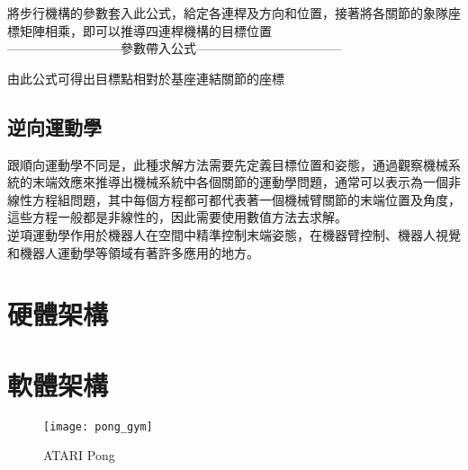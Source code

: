 將步行機構的參數套入此公式，給定各連桿及方向和位置，接著將各關節的象隊座標矩陣相乘，即可以推導四連桿機構的目標位置\\

---------------------------參數帶入公式-----------------------------------


由此公式可得出目標點相對於基座連結關節的座標\\

\subsection{逆向運動學}
跟順向運動學不同是，此種求解方法需要先定義目標位置和姿態，通過觀察機械系統的末端效應來推導出機械系統中各個關節的運動學問題，通常可以表示為一個非線性方程組問題，其中每個方程都可都代表著一個機械臂關節的末端位置及角度，這些方程一般都是非線性的，因此需要使用數值方法去求解。\\
逆項運動學作用於機器人在空間中精準控制末端姿態，在機器臂控制、機器人視覺和機器人運動學等領域有著許多應用的地方。\\

\section{硬體架構}
 
 \section{軟體架構}
\begin{figure}[hbt!]
\begin{center}
\texttt{[image: pong\_gym]}
\caption{\Large ATARI Pong}\label{fig.pong}
\end{center}
\end{figure} 

\newpage
